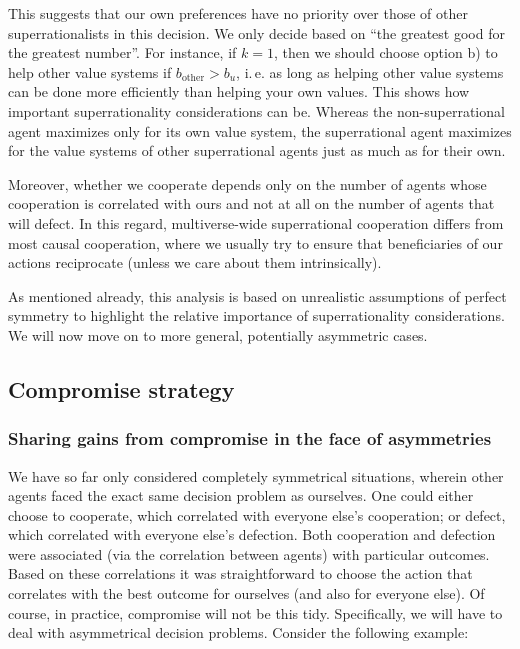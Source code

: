 This suggests that our own preferences have no priority over those of
other superrationalists in this decision. We only decide based on ``the
greatest good for the greatest number''. For instance, if \(k = 1\),
then we should choose option b) to help other value systems if
\(b_{\text{other}} > b_{u}\), i.\,e. as long as helping other value
systems can be done more efficiently than helping your own values. This
shows how important superrationality considerations can be. Whereas the
non-superrational agent maximizes only for its own value system, the
superrational agent maximizes for the value systems of other
superrational agents just as much as for their own.

Moreover, whether we cooperate depends only on the number of agents
whose cooperation is correlated with ours and not at all on the number
of agents that will defect. In this regard, multiverse-wide
superrational cooperation differs from most causal cooperation, where we
usually try to ensure that beneficiaries of our actions reciprocate
(unless we care about them intrinsically).

As mentioned already, this analysis is based on unrealistic assumptions
of perfect symmetry to highlight the relative importance of
superrationality considerations. We will now move on to more general,
potentially asymmetric cases.

\hypertarget{compromise-strategy}{\subsection{Compromise
strategy}\label{compromise-strategy}}

\subsubsection{Sharing gains from compromise in the face of
asymmetries}\label{sharing-gains-from-compromise-in-the-face-of-asymmetries}

We have so far only considered completely symmetrical situations,
wherein other agents faced the exact same decision problem as ourselves.
One could either choose to cooperate, which correlated with everyone
else's cooperation; or defect, which correlated with everyone else's
defection. Both cooperation and defection were associated (via the
correlation between agents) with particular outcomes. Based on these
correlations it was straightforward to choose the action that correlates
with the best outcome for ourselves (and also for everyone else). Of
course, in practice, compromise will not be this tidy. Specifically, we
will have to deal with asymmetrical decision problems. Consider the
following example:

